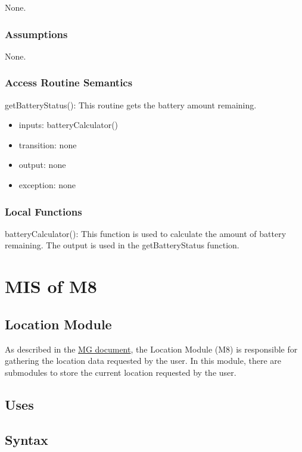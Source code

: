 None.


\subsubsection{Assumptions}

None.

\subsubsection{Access Routine Semantics}

\noindent getBatteryStatus():
This routine gets the battery amount remaining.
\begin{itemize}
\item inputs: batteryCalculator()
\item transition: none
\item output: none
\item exception: none
\end{itemize}

\subsubsection{Local Functions}

\noindent batteryCalculator():
This function is used to calculate the amount of battery remaining. The output is used in the getBatteryStatus function.



\section{MIS of M8} \label{Location} 

\subsection{Location Module}

As described in the \href{https://github.com/NevoAbigail/Capstone/blob/main/docs/Design/SoftArchitecture/MG.pdf}{MG document}, the Location Module (M8) is responsible for gathering the location data requested by the user. In this module, there are submodules to store the current location requested by the user.

\subsection{Uses}


\subsection{Syntax}

